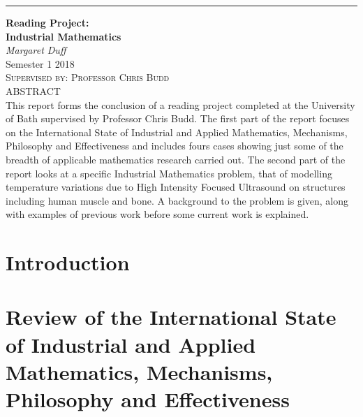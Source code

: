 \documentclass[11pt]{article} %
\begin{document}
	\begin{titlepage} %
		
		\raggedleft %
		
		\rule{1pt}{\textheight} %
		\hspace{0.05\textwidth} %
		\parbox[b]{0.75\textwidth}{ %
			
			{\Huge\bfseries Reading Project: \\[0.5\baselineskip] Industrial Mathematics}\\[2\baselineskip] %
			{\large\textit{Margaret Duff}}\\[3\baselineskip] %
			{\large{Semester 1 2018}}\\[3\baselineskip] %
			{\Large\textsc{Supervised by: Professor Chris Budd}}\\[4\baselineskip] %
			{ABSTRACT}\\[1\baselineskip]
			{This report forms the conclusion of a reading project completed at the University of Bath supervised by Professor Chris Budd. 
				The first part of the report focuses on the International State of Industrial and Applied Mathematics, Mechanisms, Philosophy and Effectiveness and includes fours cases showing just some of the breadth of applicable mathematics research carried out. The second part of the report looks at a specific Industrial Mathematics problem, that of modelling temperature variations due to High Intensity Focused Ultrasound on structures including human muscle and bone. A background to the problem is given, along with examples of previous work before some current work is explained.  }\\[4\baselineskip]
			
			
			
		}
		
	\end{titlepage}

\pagebreak
	\tableofcontents 
	\pagebreak
	\section{Introduction}
	
	\section{Review of the International State of Industrial and Applied Mathematics, Mechanisms, Philosophy and Effectiveness}
	
\end{document}
